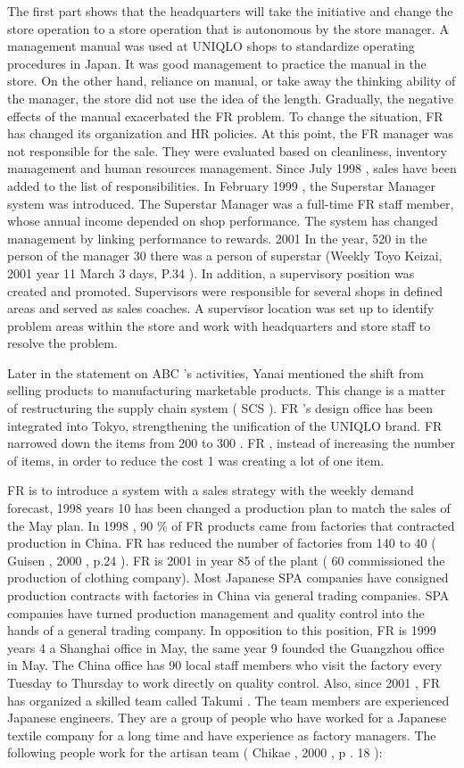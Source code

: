 \documentclass[]{article}
\begin{document}
The first part shows that the headquarters will take the initiative and
change the store operation to a store operation that is autonomous by
the store manager. A management manual was used at UNIQLO shops to
standardize operating procedures in Japan. It was good management to
practice the manual in the store. On the other hand, reliance on manual,
or take away the thinking ability of the manager, the store did not use
the idea of the length. Gradually, the negative effects of the manual
exacerbated the FR problem. To change the situation, FR has changed its
organization and HR policies. At this point, the FR manager was not
responsible for the sale. They were evaluated based on cleanliness,
inventory management and human resources management. Since July 1998 ,
sales have been added to the list of responsibilities. In February 1999
, the Superstar Manager system was introduced. The Superstar Manager was
a full-time FR staff member, whose annual income depended on shop
performance. The system has changed management by linking performance to
rewards. 2001 In the year, 520 in the person of the manager 30 there was
a person of superstar (Weekly Toyo Keizai, 2001 year 11 March 3 days,
P.34 ). In addition, a supervisory position was created and promoted.
Supervisors were responsible for several shops in defined areas and
served as sales coaches. A supervisor location was set up to identify
problem areas within the store and work with headquarters and store
staff to resolve the problem.

Later in the statement on ABC 's activities, Yanai mentioned the shift
from selling products to manufacturing marketable products. This change
is a matter of restructuring the supply chain system ( SCS ). FR 's
design office has been integrated into Tokyo, strengthening the
unification of the UNIQLO brand. FR narrowed down the items from 200 to
300 . FR , instead of increasing the number of items, in order to reduce
the cost 1 was creating a lot of one item.

FR is to introduce a system with a sales strategy with the weekly demand
forecast, 1998 years 10 has been changed a production plan to match the
sales of the May plan. In 1998 , 90 \% of FR products came from
factories that contracted production in China. FR has reduced the number
of factories from 140 to 40 ( Guisen , 2000 , p.24 ). FR is 2001 in year
85 of the plant ( 60 commissioned the production of clothing company).
Most Japanese SPA companies have consigned production contracts with
factories in China via general trading companies. SPA companies have
turned production management and quality control into the hands of a
general trading company. In opposition to this position, FR is 1999
years 4 a Shanghai office in May, the same year 9 founded the Guangzhou
office in May. The China office has 90 local staff members who visit the
factory every Tuesday to Thursday to work directly on quality control.
Also, since 2001 , FR has organized a skilled team called Takumi . The
team members are experienced Japanese engineers. They are a group of
people who have worked for a Japanese textile company for a long time
and have experience as factory managers. The following people work for
the artisan team ( Chikae , 2000 , p . 18 ):
\end{document}
